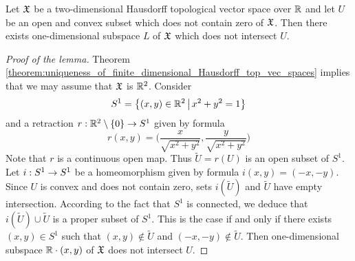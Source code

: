 \begin{lemma}\label{lemma:two_dimensional_hyperplane_separation}
Let ${\mathfrak X}$ be a two-dimensional Hausdorff topological vector space over ${\mathbb R}$ and let $U$ be an open and convex subset which does not contain zero of ${\mathfrak X}$. Then there exists one-dimensional subspace $L$ of ${\mathfrak X}$ which does not intersect $U$. 
\end{lemma}
\begin{proof}[Proof of the lemma]
Theorem \ref{theorem:uniqueness_of_finite_dimensional_Hausdorff_top_vec_spaces} implies that we may assume that ${\mathfrak X}$ is ${\mathbb R}^2$. Consider
$$S^1 = \big\{(x, y)\in {\mathbb R}^2\,\big|\,x^2 + y^2 = 1\big\}$$
and a retraction $r:{\mathbb R}^2\setminus \{0\} \rightarrow S^1$ given by formula 
$$r(x, y) = \bigg(\frac{x}{\sqrt{x^2 + y^2}},\frac{y}{\sqrt{x^2 + y^2}}\bigg)$$
Note that $r$ is a continuous open map. Thus $\tilde{U} = r(U)$ is an open subset of $S^1$. Let $i:S^1\rightarrow S^1$ be a homeomorphism given by formula $i(x, y) = (-x, -y)$. Since $U$ is convex and does not contain zero, sets $i(\tilde{U})$ and $\tilde{U}$ have empty intersection. According to the fact that $S^1$ is connected, we deduce that $i(\tilde{U}) \cup \tilde{U}$ is a proper subset of $S^1$. This is the case if and only if there exists $(x, y) \in S^1$ such that $(x, y) \not \in \tilde{U}$ and $(-x, -y) \not \in \tilde{U}$. Then one-dimensional subspace ${\mathbb R} \cdot (x, y)$ of ${\mathfrak X}$ does not intersect $U$.
\end{proof}

